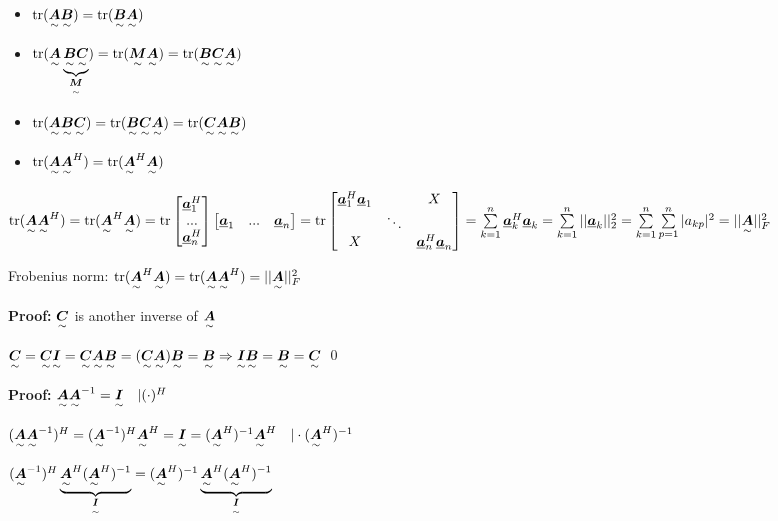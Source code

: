 \begin{itemize}
\item $\tr(\ma{A}\ma{B})=\tr(\ma{B}\ma{A})$
\item $\tr(\ma{A}\underbrace{\ma{B}\ma{C}}_{\ma{M}})=\tr(\ma{M}\ma{A})=\tr(\ma{B}\ma{C}\ma{A})$
\item $\tr(\ma{A}\ma{B}\ma{C})=\tr(\ma{B}\ma{C}\ma{A})=\tr(\ma{C}\ma{A}\ma{B})$
\item $\tr(\ma{A}\ma{A}^H)=\tr(\ma{A}^H\ma{A})$
\end{itemize}
$\tr(\ma{A}\ma{A}^H)=\tr(\ma{A}^H\ma{A})=
\tr\begin{bmatrix}\vec{a}_1^H\\...\\\vec{a}_n^H\end{bmatrix}\begin{bmatrix}\vec{a}_1&...&\vec{a}_n\end{bmatrix}
=\tr\begin{bmatrix}\vec{a}_1^H\vec{a}_1 & & X\\ &\ddots& \\X& &\vec{a}_n^H\vec{a}_n\end{bmatrix}
=\sum\limits_{k=1}^n\vec{a}_k^H\vec{a}_k=\sum\limits_{k=1}^n||\vec{a}_k||^2_2
=\sum\limits_{k=1}^n\sum\limits_{p=1}^n|a_{kp}|^2=||\ma{A}||^2_F$

Frobenius norm: $\tr(\ma{A}^H\ma{A})=\tr(\ma{A}\ma{A}^H)=||\ma{A}||^2_F$



\textbf{Proof:} $\ma{C}$ is another inverse of $\ma{A}$

$\ma{C}=\ma{C}\ma{I}=\ma{C}\ma{A}\ma{B}=(\ma{C}\ma{A})\ma{B}=\ma{B}
\Rightarrow \ma{I}\ma{B}=\ma{B}=\ma{C}$ \qed


\textbf{Proof:} $\ma{A}\ma{A}^{-1}=\ma{I}\quad |(\cdot)^H$

$(\ma{A}\ma{A}^{-1})^H=(\ma{A}^{-1})^H\ma{A}^H=\ma{I}=(\ma{A}^H)^{-1}\ma{A}^H\quad|\cdot (\ma{A}^H)^{-1}$

$(\ma{A}^{-1})^H\underbrace{\ma{A}^H(\ma{A}^H)^{-1}}_{\ma{I}}
=(\ma{A}^H)^{-1}\underbrace{\ma{A}^H(\ma{A}^H)^{-1}}_{\ma{I}}$

